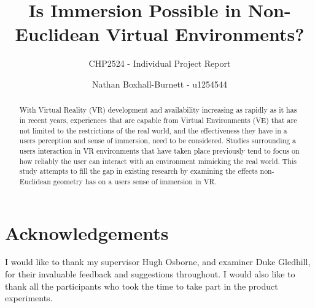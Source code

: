 \documentclass[abstract=on,12pt]{scrreprt}
\title{Is Immersion Possible in Non-Euclidean Virtual Environments?}
\subtitle{CHP2524 - Individual Project Report}
\author{Nathan Boxhall-Burnett - u1254544}
\begin{document}
	\maketitle


	\tableofcontents

	\begin{abstract}
		\thispagestyle{plain}



		With Virtual Reality (VR) development and availability increasing as rapidly as it has in recent years, experiences that are capable from Virtual Environments (VE) that are not limited to the restrictions of the real world, and the effectiveness they have in a users perception and sense of immersion, need to be considered.
		Studies surrounding a users interaction in VR environments that have taken place previously tend to focus on how reliably the user can interact with an environment mimicking the real world.
		This study attempts to fill the gap in existing research by examining the effects non-Euclidean geometry has on a users sense of immersion in VR.
	\end{abstract}

	\titleformat{\chapter}[hang]{\large\bfseries}{\thechapter}{1em}{\large}

	\setcounter{secnumdepth}{-2}

	\chapter{Acknowledgements}
		I would like to thank my supervisor Hugh Osborne, and examiner Duke Gledhill, for their invaluable feedback and suggestions throughout.
		I would also like to thank all the participants who took the time to take part in the product experiments.
\end{document}
